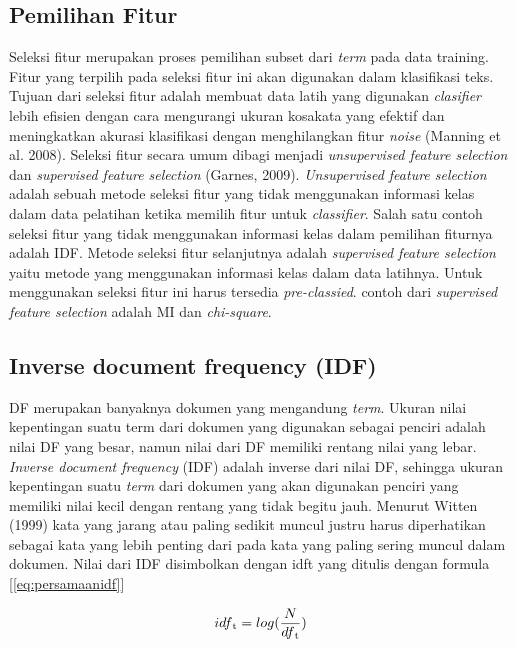 \subsection*{Pemilihan Fitur}

Seleksi fitur merupakan proses pemilihan subset dari \textit{term} pada data training. Fitur yang terpilih pada seleksi fitur ini akan digunakan dalam klasifikasi teks. Tujuan dari seleksi fitur adalah membuat data latih yang digunakan \textit{clasifier} lebih efisien dengan cara mengurangi ukuran kosakata yang efektif dan meningkatkan akurasi klasifikasi dengan menghilangkan fitur \textit{noise} (Manning et al. 2008).
Seleksi fitur secara umum dibagi menjadi \textit{unsupervised feature selection} dan \textit{supervised feature selection} (Garnes, 2009). \textit{Unsupervised feature selection} adalah sebuah metode seleksi fitur yang tidak menggunakan informasi kelas dalam data pelatihan ketika memilih fitur untuk \textit{classifier}. Salah satu contoh seleksi fitur yang tidak menggunakan informasi kelas dalam pemilihan fiturnya adalah IDF.
Metode seleksi fitur selanjutnya adalah \textit{supervised feature selection} yaitu metode yang menggunakan informasi kelas dalam data latihnya. Untuk menggunakan seleksi fitur ini harus tersedia \textit{pre-classied}. contoh dari \textit{supervised feature selection} adalah MI dan \textit{chi-square}.

\subsection*{Inverse document frequency (IDF)}

DF merupakan banyaknya dokumen yang mengandung \textit{term}. Ukuran nilai kepentingan suatu term dari dokumen yang digunakan sebagai penciri adalah nilai DF yang besar, namun nilai dari DF memiliki rentang nilai yang lebar. \textit{Inverse document frequency} (IDF) adalah inverse dari nilai DF, sehingga ukuran kepentingan suatu \textit{term} dari dokumen yang akan digunakan penciri yang memiliki nilai kecil dengan rentang yang tidak begitu jauh. Menurut Witten (1999) kata yang jarang atau paling sedikit muncul justru harus diperhatikan sebagai kata yang lebih penting dari pada kata yang paling sering muncul dalam dokumen. Nilai dari IDF disimbolkan dengan  idft  yang ditulis dengan formula [\ref{eq:persamaanidf}]

\begin{equation}
idf\textsubscript{t} = log(\frac{N}{df\textsubscript{t}})
\end{equation}

